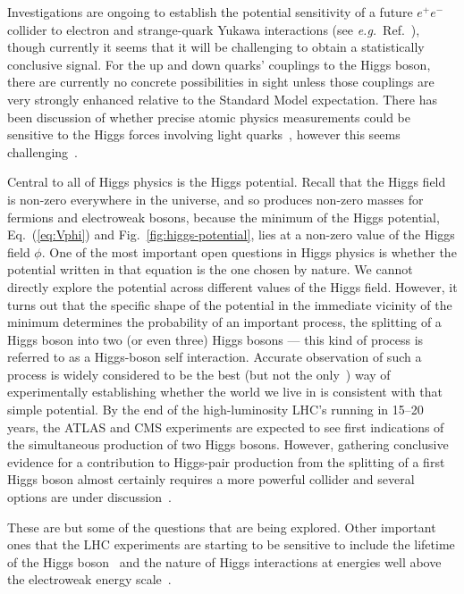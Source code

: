 \documentclass{article}
\begin{document}
Investigations are ongoing to establish the potential sensitivity of a
future $e^+e^-$ collider to electron and strange-quark Yukawa
interactions (see {\it e.g.}\ Ref.~\cite{dEnterria:2021xij}), though
currently it seems that it will be challenging to obtain a
statistically conclusive signal.
%
For the up and down quarks' couplings to the Higgs boson, there are currently no concrete
possibilities in sight unless those couplings are very strongly enhanced
relative to the Standard Model
expectation. There has been
  discussion of whether precise atomic physics measurements could be
  sensitive to the Higgs forces involving light quarks~\cite{Delaunay:2016brc},
  however this seems challenging~\cite{Flambaum:2017onb}.

Central to all of Higgs physics is the Higgs potential.
Recall that the Higgs field is non-zero everywhere in the universe, and so produces
non-zero masses for fermions and electroweak bosons, because the
minimum of the Higgs potential, Eq.~(\ref{eq:Vphi}) and
Fig.~\ref{fig:higgs-potential}, lies at a non-zero value of the Higgs
field $\phi$.
One of the most important open questions in Higgs physics is whether
the potential written in that equation is the one chosen by nature.
%
We cannot directly explore the potential across different values of the
Higgs field.
%
However, it turns out that the specific shape of the potential in the
immediate vicinity of 
the minimum
determines the probability of an important process,
the splitting of a Higgs boson into two (or even
three) Higgs bosons --- this kind of process is referred to as a
Higgs-boson self interaction.
%
Accurate observation of such a process is widely considered to be the
best (but not the only~\cite{McCullough:2013rea}) way of
experimentally establishing whether the world we live in is consistent
with that simple potential.
%
By the end of the high-luminosity LHC's running in 15--20 years, the ATLAS and CMS
experiments are expected to see first indications of the simultaneous
production of two Higgs bosons.
%
However, gathering conclusive evidence for a contribution to Higgs-pair
production  from the splitting of a first Higgs boson almost
certainly requires a more powerful
collider and several options are under
discussion~\cite{FCC:2018vvp,CEPCStudyGroup:2018rmc,Roloff:2018dqu,Franceschini:2021aqd,Delahaye:2019omf}.


These are but some of the questions that are being explored.
%
Other important ones that the LHC experiments are starting to be
sensitive to include the lifetime of the Higgs
boson~\cite{Caola:2013yja,Campbell:2013una,ATLAS:2018jym,CMS:2022ley}
and the nature of Higgs interactions at energies well above the
electroweak energy scale~\cite{ATLAS:2020jwz,CMS:2020zge}.
\end{document}
